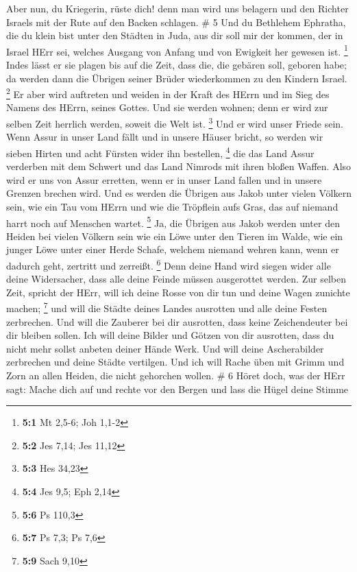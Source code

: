  Aber nun, du Kriegerin, rüste dich! denn man wird uns
belagern und den Richter Israels mit der Rute auf den Backen schlagen.
\# 5  Und du Bethlehem Ephratha, die du klein bist unter den
Städten in Juda, aus dir soll mir der kommen, der in Israel HErr sei,
welches Ausgang von Anfang und von Ewigkeit her gewesen ist. \footnote{\textbf{5:1}
  Mt 2,5-6; Joh 1,1-2}  Indes lässt er sie plagen bis auf
die Zeit, dass die, die gebären soll, geboren habe; da werden dann die
Übrigen seiner Brüder wiederkommen zu den Kindern Israel. \footnote{\textbf{5:2}
  Jes 7,14; Jes 11,12}  Er aber wird auftreten und weiden in
der Kraft des HErrn und im Sieg des Namens des HErrn, seines Gottes. Und
sie werden wohnen; denn er wird zur selben Zeit herrlich werden, soweit
die Welt ist. \footnote{\textbf{5:3} Hes 34,23}  Und er wird
unser Friede sein. Wenn Assur in unser Land fällt und in unsere Häuser
bricht, so werden wir sieben Hirten und acht Fürsten wider ihn
bestellen, \footnote{\textbf{5:4} Jes 9,5; Eph 2,14}  die
das Land Assur verderben mit dem Schwert und das Land Nimrods mit ihren
bloßen Waffen. Also wird er uns von Assur erretten, wenn er in unser
Land fallen und in unsere Grenzen brechen wird.  Und es
werden die Übrigen aus Jakob unter vielen Völkern sein, wie ein Tau vom
HErrn und wie die Tröpflein aufs Gras, das auf niemand harrt noch auf
Menschen wartet. \footnote{\textbf{5:6} Ps 110,3}  Ja, die
Übrigen aus Jakob werden unter den Heiden bei vielen Völkern sein wie
ein Löwe unter den Tieren im Walde, wie ein junger Löwe unter einer
Herde Schafe, welchem niemand wehren kann, wenn er dadurch geht,
zertritt und zerreißt. \footnote{\textbf{5:7} Ps 7,3; Ps 7,6}
 Denn deine Hand wird siegen wider alle deine Widersacher,
dass alle deine Feinde müssen ausgerottet werden.  Zur
selben Zeit, spricht der HErr, will ich deine Rosse von dir tun und
deine Wagen zunichte machen; \footnote{\textbf{5:9} Sach 9,10}
 und will die Städte deines Landes ausrotten und alle deine
Festen zerbrechen.  Und will die Zauberer bei dir
ausrotten, dass keine Zeichendeuter bei dir bleiben sollen.
 Ich will deine Bilder und Götzen von dir ausrotten, dass
du nicht mehr sollst anbeten deiner Hände Werk.  Und will
deine Ascherabilder zerbrechen und deine Städte vertilgen. 
Und ich will Rache üben mit Grimm und Zorn an allen Heiden, die nicht
gehorchen wollen. \# 6  Höret doch, was der HErr sagt: Mache
dich auf und rechte vor den Bergen und lass die Hügel deine Stimme

